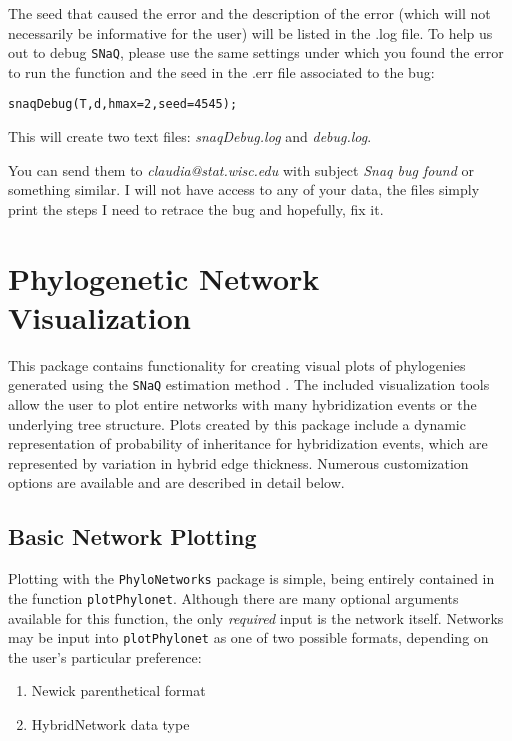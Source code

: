 \documentclass[12pt]{article}
\begin{document}
The seed that caused the error and
the description of the error (which will not necessarily be
informative for the user) will be listed in the .log file.
To help us out to debug \texttt{SNaQ}, please use the same settings
under which you found the error to run the function and the seed in
the .err file associated to the bug:
\begin{lstlisting}
snaqDebug(T,d,hmax=2,seed=4545);
\end{lstlisting}
This will create two text files: \textit{snaqDebug.log} and
\textit{debug.log}.

You can send them to
\textit{claudia@stat.wisc.edu} with subject \textit{Snaq bug found} or
something similar. I
will not have access to any of your data, the files simply print the
steps I need to retrace the bug and hopefully, fix it.


\section{Phylogenetic Network Visualization}
\label{sectPlot}
This package contains functionality for creating visual plots of
phylogenies generated using the \texttt{SNaQ} estimation method
\citep{Solis-Lemus2015}.  The included visualization tools allow the
user to plot entire networks with many hybridization events or the
underlying tree structure.  Plots created by this package include a
dynamic representation of probability of inheritance for hybridization
events, which are represented by variation in hybrid edge thickness.
Numerous customization options are available and are described in
detail below.

\subsection{Basic Network Plotting}

Plotting with the \texttt{PhyloNetworks} package is simple, being
entirely contained in the function \texttt{plotPhylonet}.  Although
there are many optional arguments available for this function, the
only \textit{required} input is the network itself.  Networks may be
input into \texttt{plotPhylonet} as one of two possible formats,
depending on the user's particular preference:
\begin{enumerate}
\item Newick parenthetical format
\item HybridNetwork data type
\end{enumerate}
\end{document}
